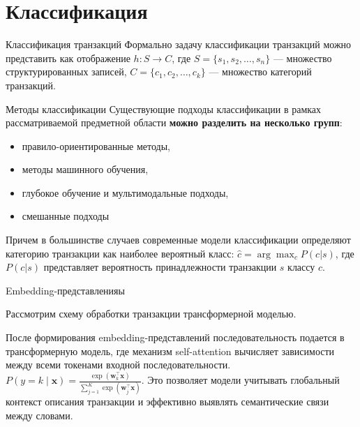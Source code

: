 \documentclass[aspectratio=169]{beamer}
\begin{document}
\section{Классификация}

\begin{frame}{Классификация транзакций}
Формально задачу классификации транзакций можно представить как отображение $h : S \rightarrow C$, где $S=\{s_1,s_2,\dots,s_n\}$ --- множество структурированных записей, $C=\{c_1,c_2,\dots,c_k\}$ --- множество категорий транзакций.

\end{frame}

\begin{frame}{Методы классификации}
    Существующие подходы классификации в рамках рассматриваемой
предметной области \textbf<2>{можно разделить на несколько групп}: 
\begin{itemize}
\item правило-ориентированные методы,
\pause
\item методы машинного обучения,
\pause
\item глубокое обучение и мультимодальные подходы,
\pause
\item смешанные подходы
\end{itemize}
\pause
Причем в большинстве случаев современные модели классификации определяют категорию транзакции как наиболее вероятный класс:
$\hat{c}=
\arg\max_c P(c|s)
$, где $P(c|s)$ представляет вероятность принадлежности
транзакции $s$ классу $c$.

\end{frame}

\begin{frame}{Embedding-представленияы}

Рассмотрим схему обработки транзакции трансформерной моделью.

\pause
После формирования embedding-представлений последовательность подается в трансформерную модель, 
где механизм self-attention вычисляет зависимости между всеми токенами входной последовательности. $P(y=k \mid \mathbf{x}) =
\frac{\exp(\mathbf{w}_k^\top \mathbf{x})}
{\sum_{j=1}^{K} \exp(\mathbf{w}_j^\top \mathbf{x})}$. Это позволяет модели учитывать глобальный контекст описания транзакции и эффективно выявлять семантические связи между словами.

\end{frame}
\end{document}
